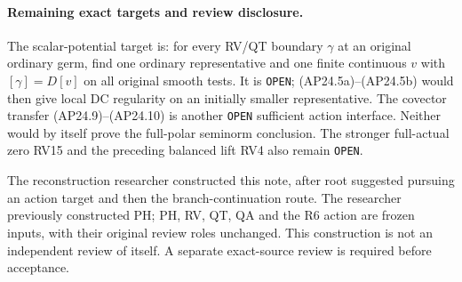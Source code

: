 \paragraph{Remaining exact targets and review disclosure.}
The scalar-potential target is: for every RV/QT boundary
\(\gamma\) at an original ordinary germ, find one ordinary
representative and one finite continuous \(v\) with
\([\gamma]=D[v]\) on all original smooth tests.  It is
\texttt{OPEN}; (AP24.5a)--(AP24.5b) would then give local DC
regularity on an initially smaller representative.  The covector
transfer (AP24.9)--(AP24.10) is
another \texttt{OPEN} sufficient action interface.  Neither
would by itself prove the full-polar seminorm conclusion.
The stronger full-actual zero RV15 and the preceding balanced
lift RV4 also remain \texttt{OPEN}.

The reconstruction researcher constructed this note, after root
suggested pursuing an action target and then the branch-continuation
route.  The researcher previously constructed PH; PH, RV, QT,
QA and the R6 action are frozen inputs, with their original review
roles unchanged.  This construction is not an independent review
of itself.  A separate exact-source review is required before
acceptance.
